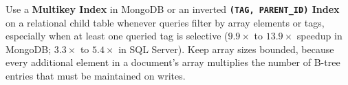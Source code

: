 Use a \textbf{Multikey Index} in MongoDB or an inverted \textbf{\texttt{(TAG, PARENT\_ID)} Index} on a relational child table whenever queries filter by array elements or tags, especially when at least one queried tag is selective ($9.9\times$ to $13.9\times$ speedup in MongoDB; $3.3\times$ to $5.4\times$ in SQL Server). Keep array sizes bounded, because every additional element in a document's array multiplies the number of B-tree entries that must be maintained on writes.
\FloatBarrier
